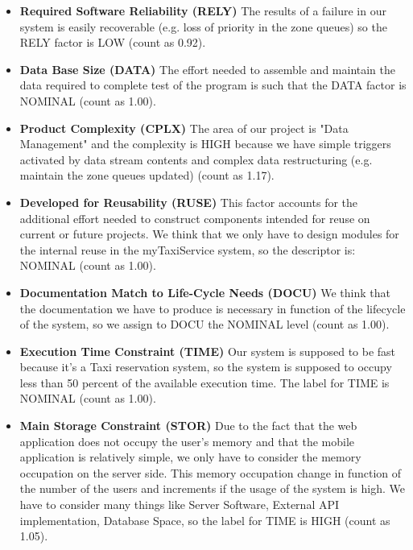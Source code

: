 \documentclass[../../../../projectPlan.tex]{subfiles}
\begin{document}
			\begin{itemize}
				\item \textbf{Required Software Reliability (RELY)}
				      The results of a failure in our system is easily recoverable (e.g. loss of priority in the zone queues) so the RELY factor is LOW (count as 0.92).

				\item \textbf{Data Base Size (DATA)}
				      The effort needed to assemble and maintain the data required to complete test of the program is such that the DATA factor is NOMINAL (count as 1.00).

				\item \textbf{Product Complexity (CPLX)}
				      The area of our project is "Data Management" and the complexity is HIGH because we have simple triggers activated by data stream contents and complex data restructuring (e.g. maintain the zone queues updated) (count as 1.17).
				
				\item \textbf{Developed for Reusability (RUSE)}
				      This factor accounts for the additional effort needed to construct components intended for reuse on current or future projects. We think that we only have to design modules for the internal reuse in the myTaxiService system, so the descriptor is: NOMINAL (count as 1.00).
				
				\item \textbf{Documentation Match to Life-Cycle Needs (DOCU)}
				      We think that the documentation we have to produce is necessary in function of the lifecycle of the system, so we assign to DOCU the NOMINAL level (count as 1.00).
				
				\item \textbf{Execution Time Constraint (TIME)}
				      Our system is supposed to be fast because it's a Taxi reservation system, so the system is supposed to occupy less than 50 percent of the available execution time.
				      The label for TIME is NOMINAL (count as 1.00).
				
				\item \textbf{Main Storage Constraint (STOR)}
				      Due to the fact that the web application does not occupy the user's memory and that the mobile application is relatively simple, we only have to consider the memory occupation on the server side. This memory occupation change in function of the number of the users and increments if the usage of the system is high. We have to consider many things like Server Software, External API implementation, Database Space, so the label for TIME is HIGH (count as 1.05).
				

\end{itemize}
\end{document}
